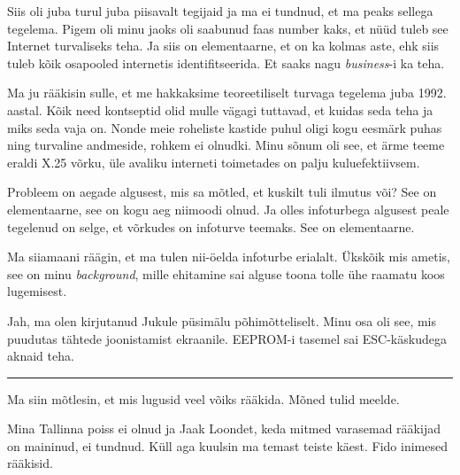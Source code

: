 Siis oli juba turul juba piisavalt tegijaid ja ma ei tundnud, et ma peaks sellega tegelema. Pigem oli minu jaoks oli saabunud faas number kaks, et nüüd tuleb see Internet turvaliseks teha. Ja siis on elementaarne, et on ka kolmas aste, ehk siis tuleb kõik osapooled internetis identifitseerida. Et saaks nagu \emph{business}-i ka teha. 


Ma ju rääkisin sulle, et me hakkaksime teoreetiliselt turvaga tegelema juba 1992. aastal. Kõik need kontseptid olid mulle vägagi tuttavad, et kuidas seda  teha ja miks seda vaja on. Nonde meie roheliste kastide puhul oligi kogu eesmärk puhas ning turvaline andmeside, rohkem ei olnudki. Minu  sõnum oli see, et ärme teeme eraldi X.25 võrku, üle avaliku interneti toimetades on palju kuluefektiivsem.


Probleem on aegade algusest, mis sa mõtled, et kuskilt tuli ilmutus või? See on elementaarne, see on kogu aeg niimoodi olnud. Ja olles  infoturbega algusest peale tegelenud on selge, et  võrkudes on infoturve  teemaks. See on elementaarne. 


Ma siiamaani räägin, et ma tulen nii-öelda infoturbe erialalt. Ükskõik mis ametis, see on minu \emph{background}, mille ehitamine sai alguse toona tolle ühe raamatu koos lugemisest.


Jah, ma olen kirjutanud Jukule püsimälu põhimõtteliselt. Minu osa oli see, mis puudutas tähtede joonistamist ekraanile. EEPROM-i tasemel sai ESC-käskudega aknaid teha. 

\bigskip
\noindent\rule{.3\textwidth}{.7pt}
\bigskip

Ma siin mõtlesin, et mis lugusid veel võiks rääkida. Mõned tulid meelde.

Mina Tallinna poiss ei olnud ja Jaak Loondet, keda mitmed varasemad rääkijad on maininud, ei tundnud. Küll aga kuulsin ma temast teiste käest. Fido inimesed rääkisid. 

